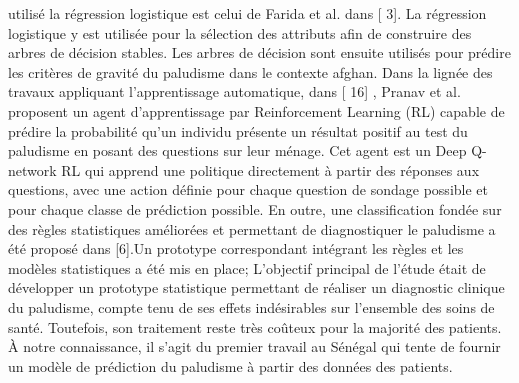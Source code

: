 utilisé la régression logistique est celui de Farida et al. dans [ 3]. La régression logistique y est utilisée pour la sélection des attributs afin de construire des arbres de décision stables. Les arbres de décision sont ensuite utilisés pour prédire les critères de gravité du paludisme dans le contexte afghan.
Dans la lignée des travaux appliquant l’apprentissage automatique, dans [ 16] , Pranav et al. proposent un agent d'apprentissage par Reinforcement Learning  (RL) capable de prédire la probabilité qu'un individu présente un résultat positif au test du paludisme en posant des questions sur leur ménage. Cet agent est un Deep Q-network  RL qui apprend une politique directement à partir des réponses aux questions, avec une action définie pour chaque question de sondage possible et pour chaque classe de prédiction possible. En outre, une classification fondée sur des règles statistiques  améliorées et permettant de diagnostiquer le paludisme a été proposé dans [6].Un prototype correspondant intégrant les règles et les modèles statistiques a été mis en place; L’objectif principal de l’étude était de développer un prototype statistique permettant de réaliser un diagnostic clinique du paludisme, compte tenu de ses effets indésirables sur l’ensemble des soins de santé. Toutefois, son traitement reste très coûteux pour la majorité des patients.
À notre connaissance, il s’agit du premier travail au Sénégal qui tente de fournir un modèle de prédiction du paludisme à partir des données des patients.

